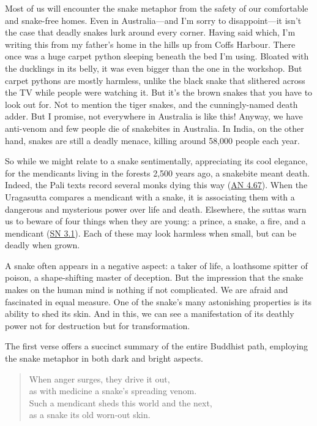 \documentclass[12pt,openany]{book}%
\begin{document}
Most of us will encounter the snake metaphor from the safety of our comfortable and snake-free homes. Even in Australia—and I’m sorry to disappoint—it isn’t the case that deadly snakes lurk around every corner. Having said which, I’m writing this from my father’s home in the hills up from Coffs Harbour. There once was a huge carpet python sleeping beneath the bed I’m using. Bloated with the ducklings in its belly, it was even bigger than the one in the workshop. But carpet pythons are mostly harmless, unlike the black snake that slithered across the TV while people were watching it. But it’s the brown snakes that you have to look out for. Not to mention the tiger snakes, and the cunningly-named death adder. But I promise, not everywhere in Australia is like this! Anyway, we have anti-venom and few people die of snakebites in Australia. In India, on the other hand, snakes are still a deadly menace, killing around 58,000 people each year.

So while we might relate to a snake sentimentally, appreciating its cool elegance, for the mendicants living in the forests 2,500 years ago, a snakebite meant death. Indeed, the Pali texts record several monks dying this way (\href{https://suttacentral.net/an4.67}{AN 4.67}). When the Uragasutta compares a mendicant with a snake, it is associating them with a dangerous and mysterious power over life and death. Elsewhere, the suttas warn us to beware of four things when they are young: a prince, a snake, a fire, and a mendicant (\href{https://suttacentral.net/sn3.1}{SN 3.1}). Each of these may look harmless when small, but can be deadly when grown.

A snake often appears in a negative aspect: a taker of life, a loathsome spitter of poison, a shape-shifting master of deception. But the impression that the snake makes on the human mind is nothing if not complicated. We are afraid and fascinated in equal measure. One of the snake’s many astonishing properties is its ability to shed its skin. And in this, we can see a manifestation of its deathly power not for destruction but for transformation.

The first verse offers a succinct summary of the entire Buddhist path, employing the snake metaphor in both dark and bright aspects.

\begin{verse}%
When anger surges, they drive it out, \\
as with medicine a snake’s spreading venom. \\
Such a mendicant sheds this world and the next, \\
as a snake its old worn-out skin.

%
\end{verse}
\end{document}
